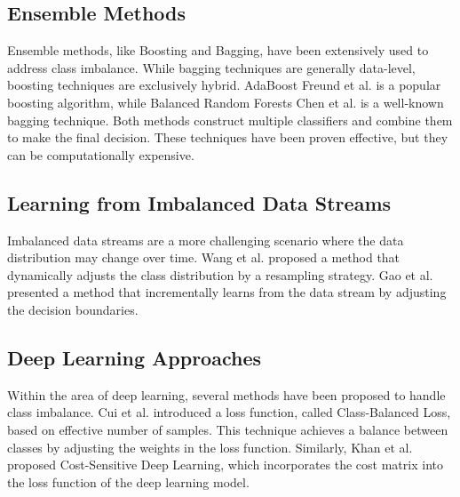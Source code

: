 \documentclass[journal]{IEEEtran}
\begin{document}
	\subsection{Ensemble Methods} 
	
	Ensemble methods, like Boosting and Bagging, have been extensively used to address class imbalance. While bagging techniques are generally data-level, boosting techniques are exclusively hybrid.
	AdaBoost Freund et al. \cite{freund1997} is a popular boosting algorithm, while Balanced Random Forests Chen et al. \cite{chen2004} is a well-known bagging technique. Both methods construct multiple classifiers and combine them to make the final decision. These techniques have been proven effective, but they can be computationally expensive.
	
	\subsection{Learning from Imbalanced Data Streams} 
	
	Imbalanced data streams are a more challenging scenario where the data distribution may change over time. Wang et al. \cite{wang2018} proposed a method that dynamically adjusts the class distribution by a resampling strategy. Gao et al. \cite{gao2015} presented a method that incrementally learns from the data stream by adjusting the decision boundaries.
	
	\subsection{Deep Learning Approaches}
	Within the area of deep learning, several methods have been proposed to handle class imbalance. Cui et al. \cite{cui2019} introduced a loss function, called Class-Balanced Loss, based on effective number of samples. This technique achieves a balance between classes by adjusting the weights in the loss function. Similarly, Khan et al. \cite{khan2017} proposed Cost-Sensitive Deep Learning, which incorporates the cost matrix into the loss function of the deep learning model.	
	
\end{document}
